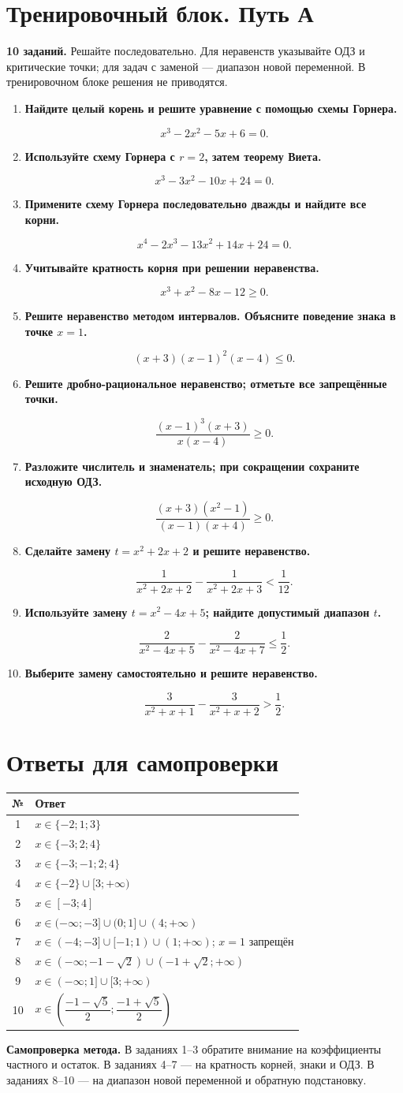 \documentclass[a4paper,12pt]{article}
\newcommand{\lessonsection}[1]{\vspace{0.3em}\section*{\color{darkaccent}#1}\vspace{-0.75em}{\color{accent}\rule{\linewidth}{0.5pt}}\vspace{0.18em}}
\newcommand{\task}[2]{\item \textbf{#1}\par\vspace{-0.2em}\[#2\]\vspace{-0.45em}}
\begin{document}
\clearpage
\lessonsection{Тренировочный блок. Путь А}
\textbf{10 заданий.} Решайте последовательно. Для неравенств указывайте ОДЗ и критические точки; для задач с заменой --- диапазон новой переменной. В тренировочном блоке решения не приводятся.
\begin{enumerate}
\task{Найдите целый корень и решите уравнение с помощью схемы Горнера.}{x^3-2x^2-5x+6=0.}
\task{Используйте схему Горнера с $r=2$, затем теорему Виета.}{x^3-3x^2-10x+24=0.}
\task{Примените схему Горнера последовательно дважды и найдите все корни.}{x^4-2x^3-13x^2+14x+24=0.}
\task{Учитывайте кратность корня при решении неравенства.}{x^3+x^2-8x-12\ge0.}
\task{Решите неравенство методом интервалов. Объясните поведение знака в точке $x=1$.}{(x+3)(x-1)^2(x-4)\le0.}
\task{Решите дробно-рациональное неравенство; отметьте все запрещённые точки.}{\frac{(x-1)^3(x+3)}{x(x-4)}\ge0.}
\task{Разложите числитель и знаменатель; при сокращении сохраните исходную ОДЗ.}{\frac{(x+3)(x^2-1)}{(x-1)(x+4)}\ge0.}
\task{Сделайте замену $t=x^2+2x+2$ и решите неравенство.}{\frac{1}{x^2+2x+2}-\frac{1}{x^2+2x+3}<\frac1{12}.}
\task{Используйте замену $t=x^2-4x+5$; найдите допустимый диапазон $t$.}{\frac{2}{x^2-4x+5}-\frac{2}{x^2-4x+7}\le\frac12.}
\task{Выберите замену самостоятельно и решите неравенство.}{\frac{3}{x^2+x+1}-\frac{3}{x^2+x+2}>\frac12.}
\end{enumerate}

\clearpage
\lessonsection{Ответы для самопроверки}
\renewcommand{\arraystretch}{1.47}
\begin{tabularx}{\linewidth}{@{}cX@{}}
\toprule
№ & Ответ\\
\midrule
1 & $x\in\{-2;1;3\}$\\
2 & $x\in\{-3;2;4\}$\\
3 & $x\in\{-3;-1;2;4\}$\\
4 & $x\in\{-2\}\cup[3;+\infty)$\\
5 & $x\in[-3;4]$\\
6 & $x\in(-\infty;-3]\cup(0;1]\cup(4;+\infty)$\\
7 & $x\in(-4;-3]\cup[-1;1)\cup(1;+\infty)$; $x=1$ запрещён\\
8 & $x\in(-\infty;-1-\sqrt2)\cup(-1+\sqrt2;+\infty)$\\
9 & $x\in(-\infty;1]\cup[3;+\infty)$\\
10 & $x\in\left(\dfrac{-1-\sqrt5}{2};\dfrac{-1+\sqrt5}{2}\right)$\\
\bottomrule
\end{tabularx}

\bigskip
\textbf{Самопроверка метода.} В заданиях 1--3 обратите внимание на коэффициенты частного и остаток. В заданиях 4--7 --- на кратность корней, знаки и ОДЗ. В заданиях 8--10 --- на диапазон новой переменной и обратную подстановку.
\end{document}
